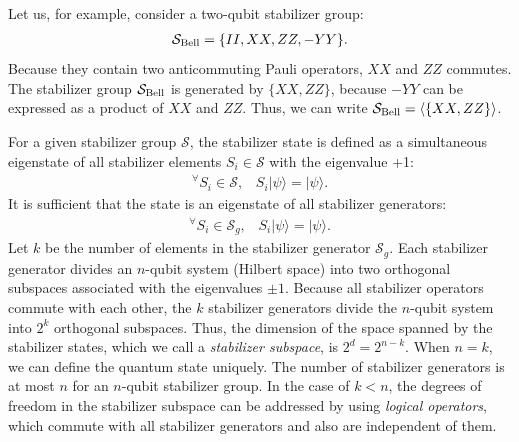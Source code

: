 Let us, for example, consider a two-qubit stabilizer group:
\begin{eqnarray}
\mathcal{S}_{\rm Bell}=\{ II, XX, ZZ, -YY\}.
\end{eqnarray} 
Because they contain two anticommuting Pauli operators, $XX$ and $ZZ$ commutes.
The stabilizer group $\mathcal{S}_{\rm Bell}$ is generated by $\{XX,ZZ\}$, because $-YY$ can be expressed as a product of $XX$ and $ZZ$.
Thus, we can write $\mathcal{S}_{\rm Bell} = \langle \{ XX,ZZ\} \rangle$.

For a given stabilizer group $\mathcal{S}$, the stabilizer state is defined as a simultaneous eigenstate of all stabilizer elements $S_i \in \mathcal{S}$ with the eigenvalue +1:
\begin{eqnarray}
{}^{\forall} S_i \in \mathcal{S}, \;\;\; S_i | \psi \rangle = |\psi \rangle   .
\end{eqnarray}
It is sufficient that the state is an eigenstate of all stabilizer generators:
\begin{eqnarray}
{}^{\forall} S_i \in \mathcal{S}_g, \;\;\; S_i | \psi \rangle = |\psi \rangle.
\end{eqnarray}
Let $k$ be the number of elements in the stabilizer generator $\mathcal{S}_g$.
Each stabilizer generator divides an $n$-qubit system (Hilbert space) into two orthogonal subspaces associated with the eigenvalues $\pm1$.
Because all stabilizer operators commute with each other, the $k$ stabilizer generators divide the $n$-qubit system into $2^{k}$ orthogonal subspaces.
Thus, the dimension of the space spanned by the stabilizer states, which we call a {\it stabilizer subspace}, is $2^d=2^{n-k}$.
When $n=k$, we can define the quantum state uniquely.
The number of stabilizer generators is at most $n$ for an $n$-qubit stabilizer group.
In the case of $k<n$, the degrees of freedom in the stabilizer subspace can be addressed by using {\it logical operators}, which commute with all stabilizer generators and also are independent of them.

